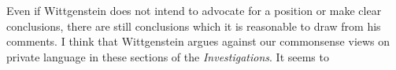 \documentclass[man,12pt,natbib]{apa6}
\begin{document}
Even if Wittgenstein does not intend to advocate for a position or make clear
conclusions, there are still conclusions which it is reasonable to draw from
his comments. I think that Wittgenstein argues against our commonsense views
%
%
on private language in these sections of the \emph{Investigations}. It seems to
\end{document}
